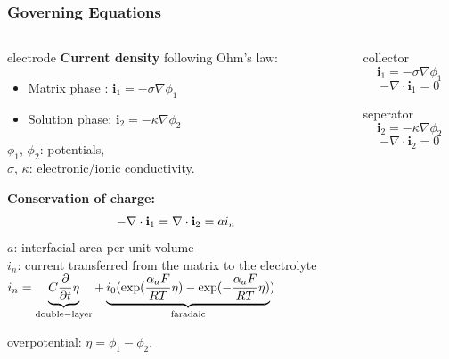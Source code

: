 \documentclass[10pt,xcolor=dvipsnames,compress]{beamer}
\begin{document}
\begin{frame}
\frametitle{Governing Equations}
\vfill

\begin{columns}
\begin{column}{.65\textwidth}
\begin{block}{electrode}
\textbf{Current density} following Ohm's law:
\begin{itemize}
\item Matrix phase :
$
\mathbf{i}_1 = -\sigma\nabla\phi_1
$
\item Solution phase:
$
\mathbf{i}_2 = -\kappa\nabla\phi_2
$
\end{itemize}
$\phi_1$, $\phi_2$: potentials,\\
$\sigma$, $\kappa$: electronic/ionic conductivity.
%

\vspace{0.1in}
\textbf{Conservation of charge:}
\vspace{-0.1in}
\begin{equation*}
-\nabla \cdot \mathbf{i}_1 =  \nabla\cdot \mathbf{i}_2 = a {i}_n
\vspace{-0.1in}
\end{equation*}
$a$: interfacial area per unit volume \\
${i}_n$: current transferred from the matrix to the electrolyte\\
$
{i}_n = \underbrace{C \frac{\partial}{\partial t} \eta}_{\rm double-layer} +
\underbrace{{i}_0 ( \exp (\frac{\alpha_aF}{RT}\eta) - \exp (-\frac{\alpha_aF}{RT}\eta)}_{\rm faradaic})
$

\vspace{0.1in}
overpotential: 
$
\eta =  \phi_1 - \phi_2.
$
\end{block}
\end{column}
\begin{column}{.30\textwidth} 
\begin{block}{collector}
\begin{equation*}
\mathbf{i}_1 = -\sigma\nabla\phi_1
\end{equation*}
\begin{equation*}
-\nabla \cdot \mathbf{i}_1 = 0
\end{equation*}
\end{block}
\begin{block}{seperator}
\begin{equation*}
\mathbf{i}_2 = -\kappa\nabla\phi_2
\end{equation*}
\begin{equation*}
-\nabla \cdot \mathbf{i}_2 = 0
\end{equation*}
\end{block}
\end{column}
\end{columns}


\vfill
\end{frame}
\end{document}
